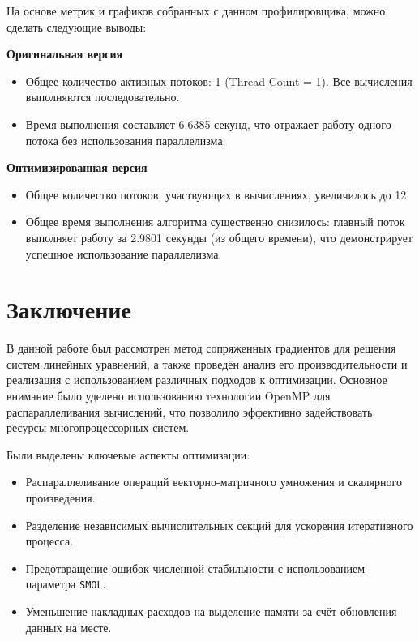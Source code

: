 \documentclass[12pt]{extarticle}
\begin{document}
\begin{spacing}{1.5}
    На основе метрик и графиков собранных с данном профилировщика, можно сделать следующие выводы:

    \textbf{Оригинальная версия}
    \begin{itemize}
        \item Общее количество активных потоков: 1 (Thread Count = 1). Все вычисления выполняются последовательно.
        \item Время выполнения составляет 6.6385 секунд, что отражает работу одного потока без использования параллелизма.
    \end{itemize}

    \textbf{Оптимизированная версия}
    \begin{itemize}
        \item Общее количество потоков, участвующих в вычислениях, увеличилось до 12.
        \item Общее время выполнения алгоритма существенно снизилось: главный поток выполняет работу за 2.9801 секунды (из общего времени), что демонстрирует успешное использование параллелизма.
    \end{itemize}

    \newpage
    \section{Заключение}

    В данной работе был рассмотрен метод сопряженных градиентов для решения систем линейных уравнений, а также проведён анализ его производительности и реализация с использованием различных подходов к оптимизации. Основное внимание было уделено использованию технологии OpenMP для распараллеливания вычислений, что позволило эффективно задействовать ресурсы многопроцессорных систем. 

    Были выделены ключевые аспекты оптимизации:
    \begin{itemize}
        \item Распараллеливание операций векторно-матричного умножения и скалярного произведения.
        \item Разделение независимых вычислительных секций для ускорения итеративного процесса.
        \item Предотвращение ошибок численной стабильности с использованием параметра \texttt{SMOL}.
        \item Уменьшение накладных расходов на выделение памяти за счёт обновления данных на месте.
    \end{itemize}


\end{spacing}
\end{document}
